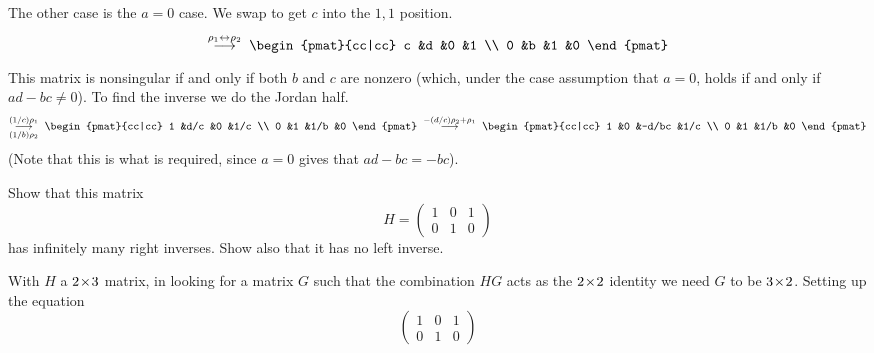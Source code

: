\begin{exercises}
\begin{answer}
      The other case is the \( a=0 \) case.
      We swap to get $c$ into the $1,1$ position.
      \begin{equation*}
        \grstep{\rho_1\leftrightarrow\rho_2}\;
        \begin{pmat}{cc|cc}
          c  &d  &0  &1  \\
          0  &b  &1  &0
        \end{pmat}
      \end{equation*}
      This matrix is nonsingular if and only if
      both \( b \) and \( c \) are nonzero
      (which, under the case assumption that \( a=0 \), 
      holds if and only if \( ad-bc\neq 0 \)).
      To find the inverse
      we do the Jordan half.
      \begin{equation*}
        \grstep[(1/b)\rho_2]{(1/c)\rho_1}\;
        \begin{pmat}{cc|cc}
          1  &d/c  &0       &1/c  \\
          0  &1    &1/b     &0
        \end{pmat}                        
        \;\grstep{-(d/c)\rho_2+\rho_1}\;
        \begin{pmat}{cc|cc}
          1  &0  &-d/bc  &1/c  \\
          0  &1  &1/b    &0
        \end{pmat}
      \end{equation*}
      (Note that this is what is required, since \( a=0 \) gives that
      \( ad-bc=-bc \)).
    \end{answer}
  \item 
    Show that this matrix 
    \begin{equation*}
      H=\begin{pmatrix}
          1  &0   &1  \\
          0  &1   &0
        \end{pmatrix}
    \end{equation*}
    has infinitely many right inverses.
    Show also that it has no left inverse.
    \begin{answer}
      With $H$ a $2 \! \times \! 3$ matrix,
      in looking for a matrix $G$ such that the combination $HG$
      acts as the $2 \! \times \! 2$ identity we
      need $G$ to be $3 \! \times \! 2$. 
      Setting up the equation
      \begin{equation*}
          \begin{pmatrix}
             1  &0   &1  \\
             0  &1   &0
           \end{pmatrix}

\end{equation*}
\end{answer}
\end{exercises}
